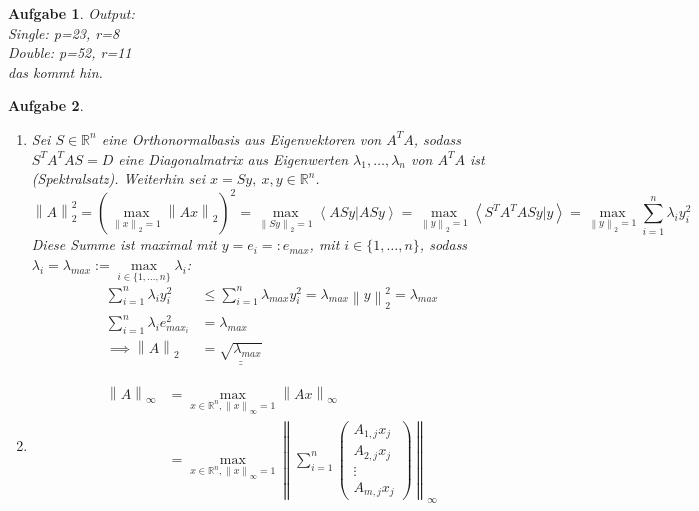 \documentclass[11pt]{article}
\theoremstyle{break}
\newtheorem{task}{Aufgabe}
\newcommand{\set}[1]{\ensuremath{\{#1\}}}
\newcommand{\norm}[1]{\ensuremath{\left\| #1 \right\|}}
\newcommand{\skal}[2]{\ensuremath{\left\langle #1 | #2 \right\rangle}}
\newcommand{\R}{\ensuremath{\mathbb{R}}}
\begin{document}
\newpage
\begin{task}
    \hfill\vspace{-5mm}
    
    Output:\\
    Single: p=23, r=8\\
    Double: p=52, r=11\\
    das kommt hin.
    
\end{task}
\newpage
\begin{task}
    \hfill\vspace{-5mm}
    \begin{enumerate} [label={(\alph*)}]
        \item Sei $S\in \R^n$ eine Orthonormalbasis aus Eigenvektoren von $A^TA$, sodass $S^TA^TAS=D$ eine Diagonalmatrix aus Eigenwerten $\lambda_1, \dots, \lambda_n$ von $A^TA$ ist (Spektralsatz). Weiterhin sei $x = Sy,\ x,y\in\R^n$.
        $$\norm{A}_2^2 = (\max\limits_{\norm{x}_2 = 1} \norm{Ax}_2)^2 = \max\limits_{\norm{Sy}_2 = 1} \skal{ASy}{ASy} = \max\limits_{\norm{y}_2 = 1} \skal{S^TA^TASy}{y} = \max\limits_{\norm{y}_2 = 1} \sum\limits_{i=1}^n \lambda_i y_i^2$$
        Diese Summe ist maximal mit $y=e_i=:e_{max}$, mit $i\in \set{1,\dots, n}$, sodass $\lambda_i = \lambda_{max} := \max\limits_{i\in\set{1,\dots,n}} \lambda_i$:
        \begin{align*}
            \sum\limits_{i=1}^n \lambda_i y_i^2&\leq \sum\limits_{i=1}^n \lambda_{max} y_i^2 = \lambda_{max} \norm{y}_2^2 = \lambda_{max}\\
            \sum\limits_{i=1}^n \lambda_i e_{max_i}^2 &= \lambda_{max}\\
            \implies \norm{A}_2 &= \underline{\underline{\sqrt{\lambda_{max}}}}
        \end{align*}
        \item \begin{align*}
            \norm{A}_\infty &= \max\limits_{x\in \R^n, \norm{x}_\infty = 1}\norm{Ax}_\infty\\
            &= \max\limits_{x\in \R^n, \norm{x}_\infty = 1}\norm{\sum\limits_{i=1}^n\left(
            \begin{matrix}
                A_{1,j}x_j\\
                A_{2,j}x_j\\
                \vdots\\
                A_{m,j}x_j
            \end{matrix}
            \right)}_\infty\\

\end{align*}
\end{enumerate}
\end{task}
\end{document}
